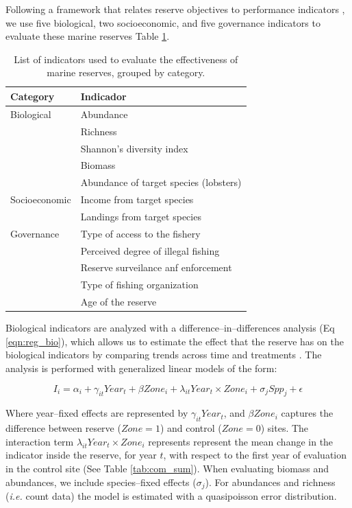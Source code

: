 \documentclass{frontiersSCNS}
\theoremstyle{definition}
\theoremstyle{definition}
\theoremstyle{definition}
\theoremstyle{remark}
\begin{document}
Following a framework that relates reserve objectives to performance
indicators \citep{Villasenor-Derbez_2018}, we use five biological, two
socioeconomic, and five governance indicators to evaluate these marine
reserves Table \ref{table:indicators}.

\begin{table}[H]

\caption{\label{tab:unnamed-chunk-3}\label{table:indicators}List of indicators used to evaluate the effectiveness of marine reserves, grouped by category.}
\centering
\begin{tabular}[t]{l|l}
\hline
Category & Indicador\\
\hline
Biological & Abundance\\
\hline
 & Richness\\
\hline
 & Shannon's diversity index\\
\hline
 & Biomass\\
\hline
 & Abundance of target species (lobsters)\\
\hline
Socioeconomic & Income from target species\\
\hline
 & Landings from target species\\
\hline
Governance & Type of access to the fishery\\
\hline
 & Perceived degree of illegal fishing\\
\hline
 & Reserve surveilance anf enforcement\\
\hline
 & Type of fishing organization\\
\hline
 & Age of the reserve\\
\hline
\end{tabular}
\end{table}

Biological indicators are analyzed with a difference--in--differences
analysis (Eq \ref{eqn:reg_bio}), which allows us to estimate the effect
that the reserve has on the biological indicators by comparing trends
across time and treatments
\citep{moland_2013-VP,Villasenor-Derbez_2018}. The analysis is performed
with generalized linear models of the form:

\begin{equation}
I_i = \alpha_{i} + \gamma_{it} Year_t + \beta Zone_i + \lambda_{it} Year_t\times Zone_i + \sigma_jSpp_j + \epsilon
\label{eqn:reg_bio}
\end{equation}

Where year--fixed effects are represented by \(\gamma_{it} Year_t\), and
\(\beta Zone_i\) captures the difference between reserve (\(Zone = 1\))
and control (\(Zone = 0\)) sites. The interaction term
\(\lambda_{it} Year_t\times Zone_i\) represents represent the mean
change in the indicator inside the reserve, for year \(t\), with respect
to the first year of evaluation in the control site (See Table
\ref{tab:com_sum}). When evaluating biomass and abundances, we include
species--fixed effects (\(\sigma_j\)). For abundances and richness
(\emph{i.e.} count data) the model is estimated with a quasipoisson
error distribution.
\end{document}
